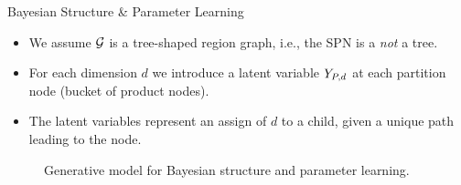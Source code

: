 \begin{frame}{Bayesian Structure \& Parameter Learning}
\begin{itemize}
    \item We assume $\mathcal{G}$ is a tree-shaped region graph, i.e., the SPN is a \emph{not} a tree.
    \item For each dimension $d$ we introduce a latent variable $Y_{P,d}$ at each partition node (bucket of product nodes).
    \item The latent variables represent an assign of $d$ to a child, given a unique path leading to the node.
\end{itemize}

\begin{figure}
    \centering
    \caption{Generative model for Bayesian structure and parameter learning.}\label{fig:BSPN}
\end{figure}
\end{frame}

